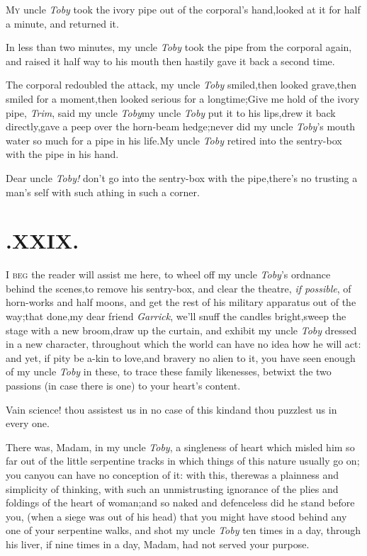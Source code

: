 \documentclass{article}
\begin{document}
\lettrine{M}{y} uncle \textit{Toby} took the ivory
pipe out of the corporal’s hand,\tsk looked at it for half
a minute, and returned it.

In less than two minutes, my uncle \textit{Toby} took the pipe
from the corporal again, and raised it half way to his
mouth\break
\tsh then hastily gave it back a second time.

The corporal redoubled the attack,\break
\tsh my uncle \textit{Toby} smiled,\tsh then looked
grave,\tsh then smiled for a moment,\tsh then
looked serious for a long\pb time;\tsh Give me hold of the
ivory pipe, \textit{Trim}, said my uncle \textit{Toby}\tsh my
uncle \textit{Toby} put it to his lips,\tsh drew it back
directly,\tsh gave a peep over the horn-beam
hedge;\tsh never did my uncle \textit{Toby}’s mouth
water so much for a pipe in his life.\tsh My uncle
\textit{Toby} retired into the sentry-box with the pipe\break
in his hand.\tsh

\tsh Dear uncle \textit{Toby!} don’t go into the
sentry-box with the pipe,\tsk there’s no trusting a
man’s self with such a\break thing in such a corner.

\enlargethispage{2\baselineskip}
\section{.\enspace XXIX.}

\lettrine{I}{ beg} the reader will assist me here,
to wheel off my uncle \textit{Toby}’s ordnance behind the
scenes,\tsh to remove his sentry-box, and clear the
theatre, \textit{if possible}, of horn-works and half moons, and get the
rest of his military apparatus out of the way;\tsh that
done,\pb my dear friend \textit{Garrick}, we’ll snuff the candles
bright,\tsk sweep the stage with a new broom,\tsk draw up the
curtain, and exhibit my uncle \textit{Toby} dressed in a new
character, throughout which the world can have no idea how he will
act: and yet, if pity be a-kin to love,\tsk and bravery no alien
to it, you have seen enough of my uncle \textit{Toby} in these, to
trace these family likenesses, betwixt the two passions (in case
there is one) to your heart’s content.

Vain science! thou assistest us in no case of this
kind\tsk and thou puzzlest us in every one.

There was, Madam, in my uncle \textit{Toby}, a singleness of heart
which misled him so far out of the little serpentine tracks in
which things of this nature usually go on; you can\tsk you can
have no conception of it: with this, there\pb was a plainness and
simplicity of thinking, with such an unmistrusting ignorance of the
plies and foldings of the heart of woman;\tsh and so naked
and defenceless did he stand before you, (when a siege was out of
his head) that you might have stood behind any one of your
serpentine walks, and shot my uncle \textit{Toby} ten times in a day,
through his liver, if nine times in a day, Madam, had not served
your purpose.
\end{document}
